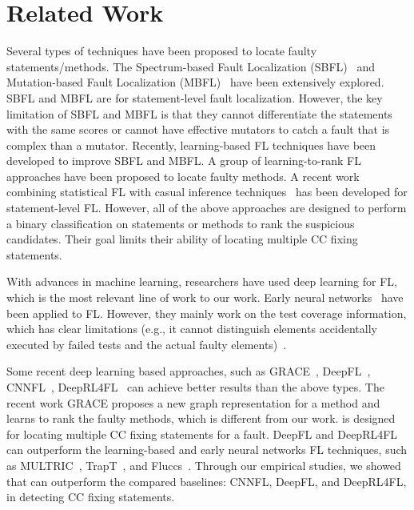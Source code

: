 \section{Related Work}

Several types of techniques have been proposed to locate faulty
statements/methods. The Spectrum-based Fault Localization
(SBFL)~\cite{zhang2011localizing, abreu2007accuracy,
  jones2005empirical, abreu2006evaluation, naish2011model,
  wong2007effective, liblit-pldi05, lucia2014extended} and
Mutation-based Fault Localization
(MBFL)~\cite{Metallaxis, MUSE, zhang2013injecting,
  budd1981mutation, zhang2010test, musco2017large} have been
extensively explored. SBFL and MBFL are for
statement-level fault localization. However, the key limitation of
SBFL and MBFL is that they cannot differentiate the statements with
the same scores or cannot have effective mutators to catch a fault
that is complex than a mutator. Recently, learning-based FL techniques
have been developed to improve SBFL and MBFL.
A group of learning-to-rank
FL~\cite{MULTRIC,TraPT,b2016learning,sohn2017fluccs} approaches have
been proposed to locate faulty methods.
A recent work combining statistical FL with casual inference
techniques~\cite{kuccuk2021improving} has been developed for
statement-level FL. However, all of the above approaches are designed
to perform a binary classification on statements or methods to rank
the suspicious candidates. Their goal limits their ability of locating
multiple CC fixing statements.

With advances in machine learning, researchers have used deep learning
for FL, which is the most relevant line of work to our work. Early
neural networks~\cite{zheng2016fault, briand2007using, zhang2017deep,
  wong2009bp} have been applied to FL.  However, they mainly work on
the test coverage information, which has clear limitations (e.g., it
cannot distinguish elements accidentally executed by failed tests and
the actual faulty elements)~\cite{TraPT}.

Some recent deep learning based approaches, such as
GRACE~\cite{lou2021boosting}, DeepFL~\cite{DeepFL},
CNNFL~\cite{zhang2019cnn}, DeepRL4FL~\cite{icse21-fl} can achieve
better results than the above types. The recent work GRACE proposes a
new graph representation for a method and learns to rank the faulty
methods, which is different from our work. {\tool} is designed for
locating multiple CC fixing statements for a fault. DeepFL and
DeepRL4FL can outperform the learning-based and early neural networks
FL techniques, such as MULTRIC~\cite{MULTRIC}, TrapT~\cite{TraPT}, and
Fluccs~\cite{sohn2017fluccs}. Through our empirical studies, we showed
that {\tool} can outperform the compared baselines: CNNFL, DeepFL, and
DeepRL4FL, in detecting CC fixing statements.


